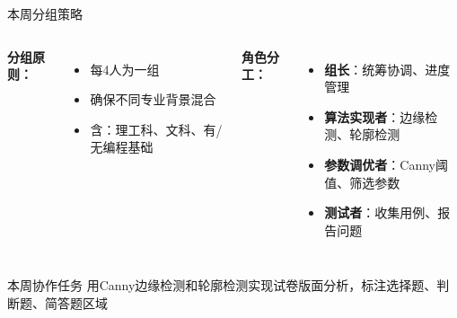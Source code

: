 \begin{frame}{本周分组策略}
    \begin{columns}
        \textbf{分组原则：}
        \begin{itemize}
            \item 每4人为一组
            \item 确保不同专业背景混合
            \item 含：理工科、文科、有/无编程基础
        \end{itemize}

        \textbf{角色分工：}
        \begin{itemize}
            \item \textbf{组长}：统筹协调、进度管理
            \item \textbf{算法实现者}：边缘检测、轮廓检测
            \item \textbf{参数调优者}：Canny阈值、筛选参数
            \item \textbf{测试者}：收集用例、报告问题
        \end{itemize}
    \end{columns}

    \vspace{0.3cm}

    \begin{block}{本周协作任务}
        用Canny边缘检测和轮廓检测实现试卷版面分析，标注选择题、判断题、简答题区域
    \end{block}
\end{frame}

